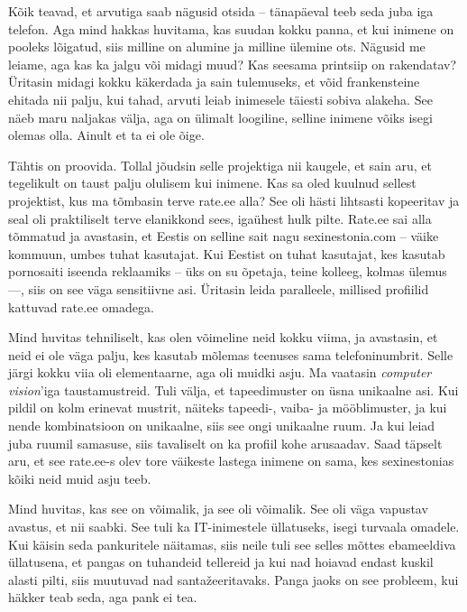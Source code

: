 Kõik teavad, et arvutiga saab nägusid otsida -- tänapäeval teeb seda juba iga 
telefon. Aga mind hakkas huvitama, kas suudan kokku panna, et kui 
inimene on pooleks lõigatud, siis milline on alumine ja milline ülemine ots. 
Nägusid me leiame, aga kas ka jalgu või midagi 
muud? Kas seesama printsiip on rakendatav? Üritasin midagi kokku käkerdada ja 
sain tulemuseks, et võid frankensteine ehitada nii palju, kui tahad, 
arvuti leiab inimesele täiesti sobiva alakeha. See näeb maru naljakas välja, 
aga on ülimalt loogiline, selline inimene võiks isegi 
olemas olla. Ainult et ta ei ole õige. 

Tähtis on proovida. Tollal jõudsin selle projektiga 
nii kaugele, et sain aru, et tegelikult on taust palju olulisem kui inimene. 
Kas sa oled kuulnud sellest projektist, kus ma tõmbasin terve 
rate.ee alla? See oli hästi lihtsasti 
kopeeritav ja seal oli praktiliselt terve elanikkond sees, igaühest 
hulk pilte. Rate.ee sai alla tõmmatud ja avastasin, et Eestis on
selline sait nagu sexinestonia.com -- väike kommuun, umbes tuhat kasutajat. Kui 
Eestist on tuhat kasutajat, kes kasutab pornosaiti iseenda reklaamiks -- üks on su õpetaja, teine kolleeg, kolmas ülemus ---, 
siis on see väga sensitiivne asi. Üritasin leida paralleele, millised 
profiilid kattuvad rate.ee omadega. 

Mind huvitas tehniliselt, kas olen võimeline neid kokku viima, ja 
avastasin, et neid ei ole väga palju, kes kasutab mõlemas teenuses sama 
telefoninumbrit. Selle järgi kokku viia oli elementaarne, aga oli 
muidki asju. Ma vaatasin \emph{computer vision}'iga taustamustreid. Tuli välja, et tapeedimuster on üsna unikaalne asi. Kui 
pildil on kolm erinevat mustrit, näiteks tapeedi-, vaiba- ja mööblimuster, ja kui nende kombinatsioon on unikaalne, 
siis see ongi unikaalne ruum. Ja kui leiad juba ruumil samasuse, siis 
tavaliselt on ka profiil kohe arusaadav. Saad täpselt aru, et see 
rate.ee-s olev tore väikeste lastega inimene on sama, kes sexinestonias 
kõiki neid muid asju teeb. 


Mind huvitas, kas see on võimalik, ja see oli võimalik. See oli väga 
vapustav avastus, et nii saabki. See tuli ka IT-inimestele üllatuseks, 
isegi turvaala omadele. Kui käisin seda pankuritele 
näitamas, siis neile tuli see selles mõttes ebameeldiva üllatusena, et 
pangas on tuhandeid tellereid ja kui nad hoiavad endast kuskil alasti pilti, siis
muutuvad nad santažeeritavaks. Panga jaoks on see probleem, kui häkker 
teab seda, aga pank ei tea. 

